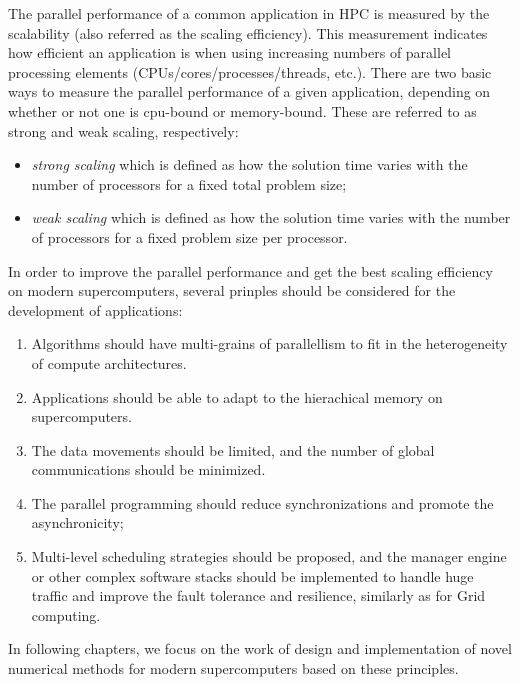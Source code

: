 The parallel performance of a common application in HPC is measured by the scalability (also referred as the scaling efficiency). This measurement indicates how efficient an application is when using increasing numbers of parallel processing elements (CPUs/cores/processes/threads, etc.). There are two basic ways to measure the parallel performance of a given application, depending on whether or not one is cpu-bound or memory-bound. These are referred to as strong and weak scaling, respectively: 
\begin{itemize}
	\item  \textit{strong scaling} which is defined as how the solution time varies with the number of processors for a fixed total problem size;
	\item \textit{weak scaling} which is defined as how the solution time varies with the number of processors for a fixed problem size per processor.
\end{itemize}

In order to improve the parallel performance and get the best scaling efficiency on modern supercomputers, several prinples should be considered for the development of applications:

	\begin{enumerate}
		\item Algorithms should have multi-grains of parallellism to fit in the heterogeneity of compute architectures.
		\item Applications should be able to adapt to the hierachical memory on supercomputers.
		\item The data movements should be limited, and the number of global communications should be minimized.
		\item The parallel programming should reduce synchronizations and promote the asynchronicity;
		\item Multi-level scheduling strategies should be proposed,  and the manager engine or other complex software stacks should be implemented to handle huge traffic and improve the fault tolerance and resilience, similarly as for Grid computing.
	\end{enumerate}

In following chapters, we focus on the work of design and implementation of novel numerical methods for modern supercomputers based on these principles.

\clearemptydoublepage